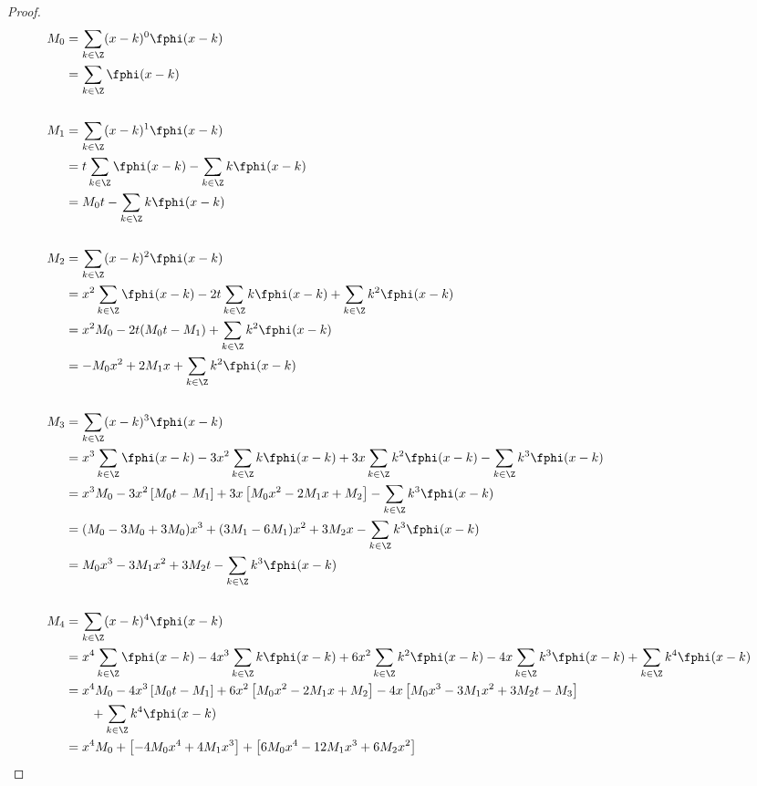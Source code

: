\begin{proof}
\begin{align*}
  M_0
    &= \sum_{k\in\Z} (x-k)^0 \fphi(x-k)
  \\&= \sum_{k\in\Z} \fphi(x-k)
  \\
  \\
  M_1
    &= \sum_{k\in\Z} (x-k)^1 \fphi(x-k)
  \\&= t \sum_{k\in\Z} \fphi(x-k) - \sum_{k\in\Z} k \fphi(x-k)
  \\&= M_0t  - \sum_{k\in\Z} k \fphi(x-k)
  \\
  \\
  M_2
    &= \sum_{k\in\Z} (x-k)^2 \fphi(x-k)
  \\&= x^2 \sum_{k\in\Z}\fphi(x-k) - 2t \sum_{k\in\Z} k\fphi(x-k) + \sum_{k\in\Z} k^2 \fphi(x-k)
  \\&= x^2 M_0 - 2t(M_0t - M_1) + \sum_{k\in\Z} k^2 \fphi(x-k)
  \\&= -M_0x^2 + 2M_1x + \sum_{k\in\Z} k^2 \fphi(x-k)
  \\
  \\
  M_3
    &= \sum_{k\in\Z} (x-k)^3 \fphi(x-k)
  \\&=  x^3 \sum_{k\in\Z}     \fphi(x-k) 
      - 3x^2 \sum_{k\in\Z} k   \fphi(x-k) 
      + 3x   \sum_{k\in\Z} k^2 \fphi(x-k) 
      -      \sum_{k\in\Z} k^3 \fphi(x-k) 
  \\&=  x^3 M_0
      - 3x^2 \left[ M_0t - M_1 \right]
      + 3x   \left[ M_0x^2 - 2M_1x + M_2 \right]
      -      \sum_{k\in\Z} k^3 \fphi(x-k) 
  \\&= (M_0-3M_0+3M_0)x^3 + (3M_1-6M_1)x^2 + 3M_2 x -\sum_{k\in\Z} k^3 \fphi(x-k) 
  \\&= M_0x^3 -3M_1 x^2 + 3M_2t - \sum_{k\in\Z} k^3 \fphi(x-k) 
  \\
  \\
  M_4
    &= \sum_{k\in\Z} (x-k)^4  \fphi(x-k)
  \\&=  x^4 \sum_{k\in\Z}     \fphi(x-k)
      - 4x^3 \sum_{k\in\Z} k   \fphi(x-k)
      + 6x^2 \sum_{k\in\Z} k^2 \fphi(x-k)
      - 4x   \sum_{k\in\Z} k^3 \fphi(x-k)
      +      \sum_{k\in\Z} k^4 \fphi(x-k)
  \\&=  x^4 M_0
      - 4x^3 \left[ M_0t   -  M_1  \right]
      + 6x^2 \left[ M_0x^2 - 2M_1x   + M_2  \right]
      - 4x   \left[ M_0x^3 - 3M_1x^2 + 3M_2t - M_3  \right]
      \\&\qquad+      \sum_{k\in\Z} k^4 \fphi(x-k)
  \\&=  x^4 M_0
      + \left[ - 4M_0x^4   + 4M_1x^3  \right]
      + \left[ 6M_0x^4 - 12M_1x^3  + 6M_2x^2  \right]

\end{align*}
\end{proof}
